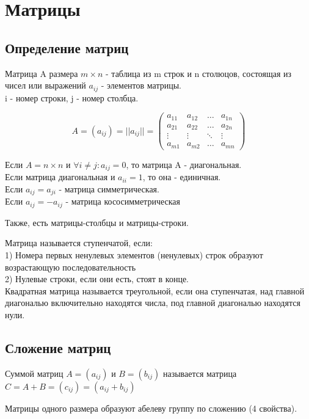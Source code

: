 \section{Матрицы}
\subsection{Определение матриц}
\begin{defin}
Матрица A размера $m\times n$ - таблица из m строк и n столюцов, состоящая из
чисел или выражений $a_{ij}$ - элементов матрицы.\\ i - номер строки, j - 
номер столбца.   
\end{defin}

\begin{equation*}
A = (a_{ij}) = ||a_{ij}|| = \left(
\begin{array}{cccc}
a_{11} & a_{12} & \ldots & a_{1n}\\
a_{21} & a_{22} & \ldots & a_{2n}\\
\vdots & \vdots & \ddots & \vdots\\
a_{m1} & a_{m2} & \ldots & a_{mn}
\end{array}
\right)
\end{equation*}

\begin{defin}
Если $A=n \times n$ и $\forall i\ne j: a_{ij}=0$, то матрица A - диагональная.\\
Если матрица диагональная и $a_{ii}=1$, то она - единичная.\\
Если $a_{ij}=a_{ji}$ - матрица симметрическая.\\
Если $a_{ij}=-a_{ij}$ - матрица кососимметрическая
\end{defin}
Также, есть матрицы-столбцы и матрицы-строки.
\begin{defin}
Матрица называется ступенчатой, если:\\
1) Номера первых ненулевых элементов (ненулевых) строк образуют возрастающую 
последовательность\\
2) Нулевые строки, если они есть, стоят в конце.  \\
Квадратная матрица называется треугольной, если она ступенчатая, над главной 
диагональю включительно находятся числа, под главной диагональю находятся нули.
\end{defin}

\subsection{Сложение матриц}
\begin{defin}
Суммой матриц $A=(a_{ij})$ и $B=(b_{ij})$ называется матрица\\
$C=A+B=(c_{ij})=(a_{ij}+b_{ij})$ 
\end{defin}
Матрицы одного размера образуют абелеву группу по сложению (4 свойства).

